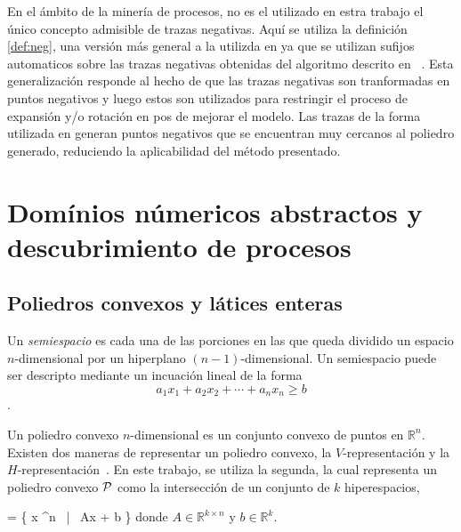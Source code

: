 En el ámbito de la minería de procesos, no es el utilizado en estra trabajo el único
concepto admisible de trazas negativas. 
Aquí se utiliza la definición \autoref{def:neg}, una versión más general 
a la utilizda en \cite{Goedertier2009,BrouckeWVB14} ya que se utilizan sufijos
automaticos sobre las trazas negativas obtenidas del algoritmo 
descrito en ~\cite{BrouckeWVB14}.
Esta generalización responde al hecho  de que las trazas negativas 
son tranformadas en puntos negativos y luego estos son utilizados
para restringir el proceso de expansión y/o rotación en pos de mejorar el modelo.
Las trazas de la forma utilizada en \cite{Goedertier2009,BrouckeWVB14} generan
puntos negativos que se encuentran muy cercanos al poliedro generado, reduciendo la aplicabilidad del 
método presentado.

\section{Domínios númericos abstractos y descubrimiento de procesos} 
\label{sec:2.discovery}

\subsection{Poliedros convexos y látices enteras} 
\label{sec:2.discovery polyhedra}

Un \textit{semiespacio} es cada
una de las porciones en las que queda dividido un espacio $n$-dimensional por un hiperplano $(n-1)$-dimensional. Un semiespacio
puede ser descripto mediante un incuación lineal de la forma $$a_1x_1 + a_2x_2 + \cdots + a_nx_n \geq b$$.

Un poliedro convexo $n$-dimensional es un conjunto convexo de puntos en $\mathbb{R}^n$. Existen 
dos maneras de representar un poliedro convexo, la $V$-representación y la $H$-representación~\cite{Rockafellar70}.
En este trabajo, se utiliza la segunda, la cual representa un poliedro convexo ${\mathcal P}$ 
como la intersección de un conjunto de $k$ hiperespacios,

    \ph = \{ x \in {}^n ~|~ A\cdot x + b \}
\eequation
donde  \mbox{$A \in \mathbb{R}^{k \times n}$} y
\mbox{$b\in\mathbb{R}^{k}$}.

